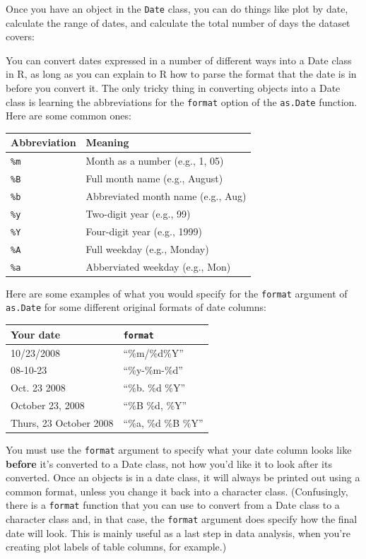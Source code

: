 \documentclass[]{book}
\makeatletter
\newenvironment{Shaded}{\begin{snugshade}}{\end{snugshade}}
\newcommand{\KeywordTok}[1]{\textcolor[rgb]{0.13,0.29,0.53}{\textbf{#1}}}
\newcommand{\OperatorTok}[1]{\textcolor[rgb]{0.81,0.36,0.00}{\textbf{#1}}}
\newcommand{\NormalTok}[1]{#1}
\newenvironment{kframe}{%
\medskip{}
\setlength{\fboxsep}{.8em}
 \def\at@end@of@kframe{}%
 \ifinner\ifhmode%
  \def\at@end@of@kframe{\end{minipage}}%
  \begin{minipage}{\columnwidth}%
 \fi\fi%
 \def\FrameCommand##1{\hskip\@totalleftmargin \hskip-\fboxsep
 \colorbox{shadecolor}{##1}\hskip-\fboxsep
     \hskip-\linewidth \hskip-\@totalleftmargin \hskip\columnwidth}%
 \MakeFramed {\advance\hsize-\width
   \@totalleftmargin\z@ \linewidth\hsize
   \@setminipage}}%
 {\par\unskip\endMakeFramed%
 \at@end@of@kframe}
\renewenvironment{Shaded}{\begin{kframe}}{\end{kframe}}
\newenvironment{rmdblock}[1]
  {
  \begin{itemize}
  \renewcommand{\labelitemi}{
    \raisebox{-.7\height}[0pt][0pt]{
      {\setkeys{Gin}{width=3em,keepaspectratio}\texttt{[image: images/\#1]}}
    }
  }
  \setlength{\fboxsep}{1em}
  \begin{kframe}
  \item
  }
  {
  \end{kframe}
  \end{itemize}
  }
\newenvironment{rmdwarning}
  {\begin{rmdblock}{warning}}
  {\end{rmdblock}}
\theoremstyle{definition}
\theoremstyle{definition}
\theoremstyle{definition}
\theoremstyle{remark}
\makeatother
\begin{document}
Once you have an object in the \texttt{Date} class, you can do things
like plot by date, calculate the range of dates, and calculate the total
number of days the dataset covers:

\begin{Shaded}
\end{Shaded}

You can convert dates expressed in a number of different ways into a
Date class in R, as long as you can explain to R how to parse the format
that the date is in before you convert it. The only tricky thing in
converting objects into a Date class is learning the abbreviations for
the \texttt{format} option of the \texttt{as.Date} function. Here are
some common ones:

\begin{longtable}[]{@{}ll@{}}
\toprule
Abbreviation & Meaning\tabularnewline
\midrule
\endhead
\texttt{\%m} & Month as a number (e.g., 1, 05)\tabularnewline
\texttt{\%B} & Full month name (e.g., August)\tabularnewline
\texttt{\%b} & Abbreviated month name (e.g., Aug)\tabularnewline
\texttt{\%y} & Two-digit year (e.g., 99)\tabularnewline
\texttt{\%Y} & Four-digit year (e.g., 1999)\tabularnewline
\texttt{\%A} & Full weekday (e.g., Monday)\tabularnewline
\texttt{\%a} & Abberviated weekday (e.g., Mon)\tabularnewline
\bottomrule
\end{longtable}

Here are some examples of what you would specify for the \texttt{format}
argument of \texttt{as.Date} for some different original formats of date
columns:

\begin{longtable}[]{@{}ll@{}}
\toprule
Your date & \texttt{format}\tabularnewline
\midrule
\endhead
10/23/2008 & ``\%m/\%d\%Y''\tabularnewline
08-10-23 & ``\%y-\%m-\%d''\tabularnewline
Oct. 23 2008 & ``\%b. \%d \%Y''\tabularnewline
October 23, 2008 & ``\%B \%d, \%Y''\tabularnewline
Thurs, 23 October 2008 & ``\%a, \%d \%B \%Y''\tabularnewline
\bottomrule
\end{longtable}

\begin{rmdwarning}
You must use the \texttt{format} argument to specify what your date
column looks like \textbf{before} it's converted to a Date class, not
how you'd like it to look after its converted. Once an objects is in a
date class, it will always be printed out using a common format, unless
you change it back into a character class. (Confusingly, there is a
\texttt{format} function that you can use to convert from a Date class
to a character class and, in that case, the \texttt{format} argument
does specify how the final date will look. This is mainly useful as a
last step in data analysis, when you're creating plot labels of table
columns, for example.)
\end{rmdwarning}
\end{document}
